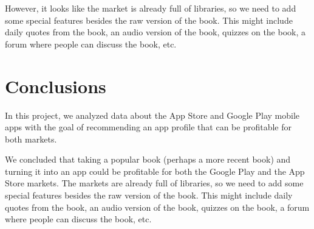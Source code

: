 \documentclass[11pt]{article}
\begin{document}
    However, it looks like the market is already full of libraries, so we
need to add some special features besides the raw version of the book.
This might include daily quotes from the book, an audio version of the
book, quizzes on the book, a forum where people can discuss the book,
etc.

    \section{Conclusions}\label{conclusions}

    In this project, we analyzed data about the App Store and Google Play
mobile apps with the goal of recommending an app profile that can be
profitable for both markets.

    We concluded that taking a popular book (perhaps a more recent book) and
turning it into an app could be profitable for both the Google Play and
the App Store markets. The markets are already full of libraries, so we
need to add some special features besides the raw version of the book.
This might include daily quotes from the book, an audio version of the
book, quizzes on the book, a forum where people can discuss the book,
etc.


    
    
    
    
\end{document}
